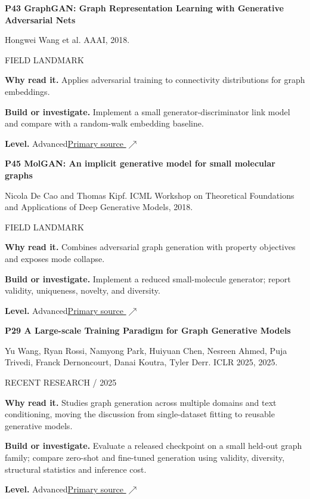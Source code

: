 \documentclass[11pt,letterpaper]{article}
\begin{document}
\begin{minipage}{\linewidth}
{\large\bfseries P43 GraphGAN: Graph Representation Learning with Generative Adversarial Nets}\par
Hongwei Wang et al. AAAI, 2018.\par
\textcolor{ink}{\small FIELD LANDMARK}\par
\textbf{Why read it.} Applies adversarial training to connectivity distributions for graph embeddings.\par
\textbf{Build or investigate.} Implement a small generator-discriminator link model and compare with a random-walk embedding baseline.\par
\textbf{Level.} Advanced\quad\href{https://arxiv.org/abs/1711.08267}{Primary source $\nearrow$}\par
\end{minipage}\par\vspace{10pt}
\begin{minipage}{\linewidth}
{\large\bfseries P45 MolGAN: An implicit generative model for small molecular graphs}\par
Nicola De Cao and Thomas Kipf. ICML Workshop on Theoretical Foundations and Applications of Deep Generative Models, 2018.\par
\textcolor{ink}{\small FIELD LANDMARK}\par
\textbf{Why read it.} Combines adversarial graph generation with property objectives and exposes mode collapse.\par
\textbf{Build or investigate.} Implement a reduced small-molecule generator; report validity, uniqueness, novelty, and diversity.\par
\textbf{Level.} Advanced\quad\href{https://arxiv.org/abs/1805.11973}{Primary source $\nearrow$}\par
\end{minipage}\par\vspace{10pt}
\begin{minipage}{\linewidth}
{\large\bfseries P29 A Large-scale Training Paradigm for Graph Generative Models}\par
Yu Wang, Ryan Rossi, Namyong Park, Huiyuan Chen, Nesreen Ahmed, Puja Trivedi, Franck Dernoncourt, Danai Koutra, Tyler Derr. ICLR 2025, 2025.\par
\textcolor{ink}{\small RECENT RESEARCH / 2025}\par
\textbf{Why read it.} Studies graph generation across multiple domains and text conditioning, moving the discussion from single-dataset fitting to reusable generative models.\par
\textbf{Build or investigate.} Evaluate a released checkpoint on a small held-out graph family; compare zero-shot and fine-tuned generation using validity, diversity, structural statistics and inference cost.\par
\textbf{Level.} Advanced\quad\href{https://proceedings.iclr.cc/paper_files/paper/2025/hash/3a2ef31a1e45908901adc0ca853a8faf-Abstract-Conference.html}{Primary source $\nearrow$}\par
\end{minipage}\par\vspace{10pt}
\end{document}
